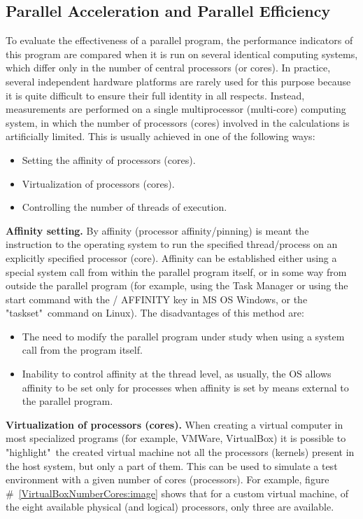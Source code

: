 { %
	\subsection{Parallel Acceleration and Parallel Efficiency}
	\par To evaluate the effectiveness of a parallel program, the performance indicators of this program are compared when it is run on several identical computing systems, which differ only in the number of central processors (or cores). In practice, several independent hardware platforms are rarely used for this purpose because it is quite difficult to ensure their full identity in all respects. Instead, measurements are performed on a single multiprocessor (multi-core) computing system, in which the number of processors (cores) involved in the calculations is artificially limited. This is usually achieved in one of the following ways:
	\begin{itemize}
		\item Setting the affinity of processors (cores).
		\item Virtualization of processors (cores).
		\item Controlling the number of threads of execution.
	\end{itemize}
	\textbf{Affinity setting.} By affinity (processor affinity/pinning) is meant the instruction to the operating system to run the specified thread/process on an explicitly specified processor (core). Affinity can be established either using a special system call from within the parallel program itself, or in some way from outside the parallel program (for example, using the Task Manager or using the start command with the / AFFINITY key in MS OS Windows, or the "taskset"\ command on Linux). The disadvantages of this method are:
	\begin{itemize}
		\item The need to modify the parallel program under study when using a system call from the program itself.
		\item Inability to control affinity at the thread level, as usually, the OS allows affinity to be set only for processes when affinity is set by means external to the parallel program.
	\end{itemize}
	\textbf{Virtualization of processors (cores).} When creating a virtual computer in most specialized programs (for example, VMWare, VirtualBox) it is possible to "highlight"\ the created virtual machine not all the processors (kernels) present in the host system, but only a part of them. This can be used to simulate a test environment with a given number of cores (processors). For example,  figure \#~\ref{VirtualBoxNumberCores:image} shows that for a custom virtual machine, of the eight available physical (and logical) processors, only three are available.
}
